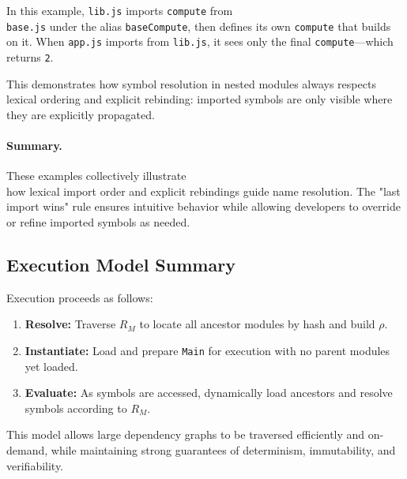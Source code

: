 \documentclass[sigplan,screen]{acmart}
\begin{document}
In this example, \texttt{lib.js} imports \texttt{compute} from \\\texttt{base.js} under the alias \texttt{baseCompute}, then defines its own \texttt{compute} that builds on it. When \texttt{app.js} imports from \texttt{lib.js}, it sees only the final \texttt{compute}—which returns \texttt{2}.

This demonstrates how symbol resolution in nested modules always respects lexical ordering and explicit rebinding: imported symbols are only visible where they are explicitly propagated.

\paragraph{Summary.}

These examples collectively illustrate \\how lexical import order and explicit rebindings guide name resolution. The "last import wins" rule ensures intuitive behavior while allowing developers to override or refine imported symbols as needed.

\subsection{Execution Model Summary}

Execution proceeds as follows:
\begin{enumerate}
    \item \textbf{Resolve:} Traverse $R_M$ to locate all ancestor modules by hash and build $\rho$.
    \item \textbf{Instantiate:} Load and prepare \texttt{Main} for execution with no parent modules yet loaded.
    \item \textbf{Evaluate:} As symbols are accessed, dynamically load ancestors and resolve symbols according to $R_M$.
\end{enumerate}

This model allows large dependency graphs to be traversed efficiently and on-demand, while maintaining strong guarantees of determinism, immutability, and verifiability.
\end{document}
